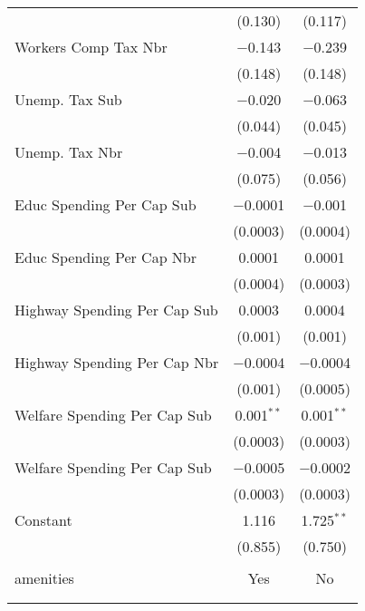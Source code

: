 \begin{table}[!htbp]
\begin{tabular}{@{\extracolsep{5pt}}lcc}
  & (0.130) & (0.117) \\ 
  Workers Comp Tax Nbr & $-$0.143 & $-$0.239 \\ 
  & (0.148) & (0.148) \\ 
  Unemp. Tax Sub & $-$0.020 & $-$0.063 \\ 
  & (0.044) & (0.045) \\ 
  Unemp. Tax Nbr & $-$0.004 & $-$0.013 \\ 
  & (0.075) & (0.056) \\ 
  Educ Spending Per Cap Sub & $-$0.0001 & $-$0.001 \\ 
  & (0.0003) & (0.0004) \\ 
  Educ Spending Per Cap Nbr & 0.0001 & 0.0001 \\ 
  & (0.0004) & (0.0003) \\ 
  Highway Spending Per Cap Sub & 0.0003 & 0.0004 \\ 
  & (0.001) & (0.001) \\ 
  Highway Spending Per Cap Nbr & $-$0.0004 & $-$0.0004 \\ 
  & (0.001) & (0.0005) \\ 
  Welfare Spending Per Cap Sub & 0.001$^{**}$ & 0.001$^{**}$ \\ 
  & (0.0003) & (0.0003) \\ 
  Welfare Spending Per Cap Sub & $-$0.0005 & $-$0.0002 \\ 
  & (0.0003) & (0.0003) \\ 
  Constant & 1.116 & 1.725$^{**}$ \\ 
  & (0.855) & (0.750) \\ 
 \hline \\[-1.8ex] 
amenities & Yes & No \\ 
\hline \\[-1.8ex] 
\hline 
\hline \\[-1.8ex] 
\end{tabular} 
\end{table} 
